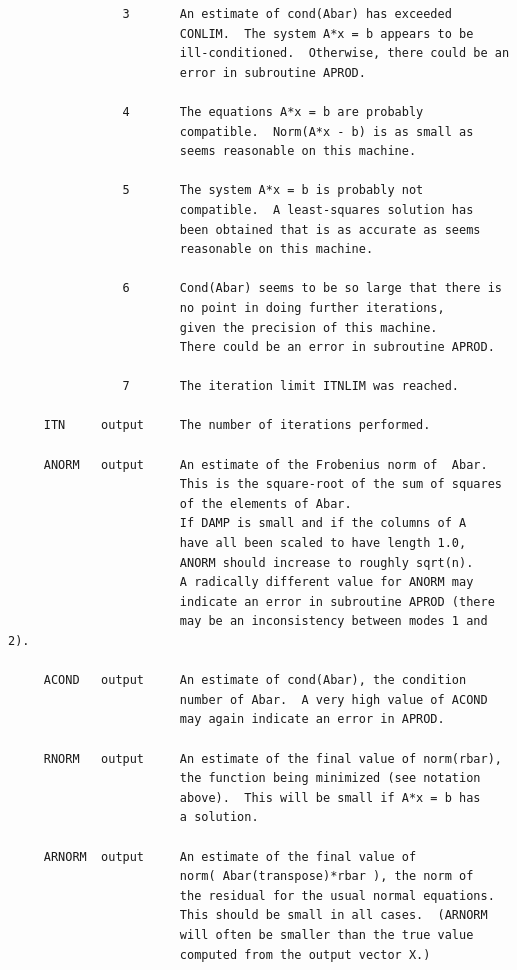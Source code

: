 \documentclass[11pt,twoside]{article}
\begin{document}
\begin{verbatim}
                3       An estimate of cond(Abar) has exceeded
                        CONLIM.  The system A*x = b appears to be
                        ill-conditioned.  Otherwise, there could be an
                        error in subroutine APROD.

                4       The equations A*x = b are probably
                        compatible.  Norm(A*x - b) is as small as
                        seems reasonable on this machine.

                5       The system A*x = b is probably not
                        compatible.  A least-squares solution has
                        been obtained that is as accurate as seems
                        reasonable on this machine.

                6       Cond(Abar) seems to be so large that there is
                        no point in doing further iterations,
                        given the precision of this machine.
                        There could be an error in subroutine APROD.

                7       The iteration limit ITNLIM was reached.

     ITN     output     The number of iterations performed.

     ANORM   output     An estimate of the Frobenius norm of  Abar.
                        This is the square-root of the sum of squares
                        of the elements of Abar.
                        If DAMP is small and if the columns of A
                        have all been scaled to have length 1.0,
                        ANORM should increase to roughly sqrt(n).
                        A radically different value for ANORM may
                        indicate an error in subroutine APROD (there
                        may be an inconsistency between modes 1 and 2).

     ACOND   output     An estimate of cond(Abar), the condition
                        number of Abar.  A very high value of ACOND
                        may again indicate an error in APROD.

     RNORM   output     An estimate of the final value of norm(rbar),
                        the function being minimized (see notation
                        above).  This will be small if A*x = b has
                        a solution.

     ARNORM  output     An estimate of the final value of
                        norm( Abar(transpose)*rbar ), the norm of
                        the residual for the usual normal equations.
                        This should be small in all cases.  (ARNORM
                        will often be smaller than the true value
                        computed from the output vector X.)


\end{verbatim}
\end{document}
